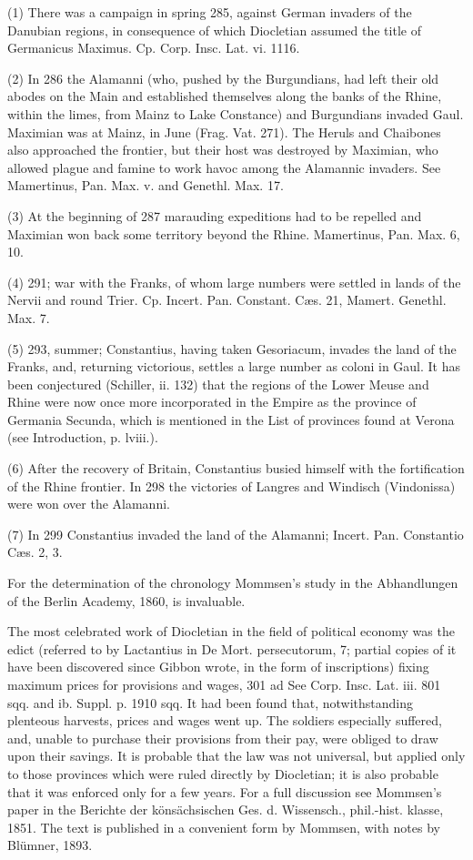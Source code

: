 (1) There was a campaign in spring 285, against German invaders of the Danubian regions, in consequence of which Diocletian assumed the title of Germanicus Maximus. Cp. Corp. Insc. Lat. vi. 1116.

(2) In 286 the Alamanni (who, pushed by the Burgundians, had left their old abodes on the Main and established themselves along the banks of the Rhine, within the limes, from Mainz to Lake Constance) and Burgundians invaded Gaul. Maximian was at Mainz, in June (Frag. Vat. 271). The Heruls and Chaibones also approached the frontier, but their host was destroyed by Maximian, who allowed plague and famine to work havoc among the Alamannic invaders. See Mamertinus, Pan. Max. v. and Genethl. Max. 17.

(3) At the beginning of 287 marauding expeditions had to be repelled and Maximian won back some territory beyond the Rhine. Mamertinus, Pan. Max. 6, 10.

(4) 291; war with the Franks, of whom large numbers were settled in lands of the Nervii and round Trier. Cp. Incert. Pan. Constant. Cæs. 21, Mamert. Genethl. Max. 7.

(5) 293, summer; Constantius, having taken Gesoriacum, invades the land of the Franks, and, returning victorious, settles a large number as coloni in Gaul. It has been conjectured (Schiller, ii. 132) that the regions of the Lower Meuse and Rhine were now once more incorporated in the Empire as the province of Germania Secunda, which is mentioned in the List of provinces found at Verona (see Introduction, p. lviii.).

(6) After the recovery of Britain, Constantius busied himself with the fortification of the Rhine frontier. In 298 the victories of Langres and Windisch (Vindonissa) were won over the Alamanni.

(7) In 299 Constantius invaded the land of the Alamanni; Incert. Pan. Constantio Cæs. 2, 3.

For the determination of the chronology Mommsen\texthebrew{}’s study in the Abhandlungen of the Berlin Academy, 1860, is invaluable.


The most celebrated work of Diocletian in the field of political economy was the edict (referred to by Lactantius in De Mort. persecutorum, 7; partial copies of it have been discovered since Gibbon wrote, in the form of inscriptions) fixing maximum prices for provisions and wages, 301 ad See Corp. Insc. Lat. iii. 801 sqq. and ib. Suppl. p. 1910 sqq. It had been found that, notwithstanding plenteous harvests, prices and wages went up. The soldiers especially suffered, and, unable to purchase their provisions from their pay, were obliged to draw upon their savings. It is probable that the law was not universal, but applied only to those provinces which were ruled directly by Diocletian; it is also probable that it was enforced only for a few years. For a full discussion see Mommsen\texthebrew{}’s paper in the Berichte der könsächsischen Ges. d. Wissensch., phil.-hist. klasse, 1851. The text is published in a convenient form by Mommsen, with notes by Blümner, 1893.

